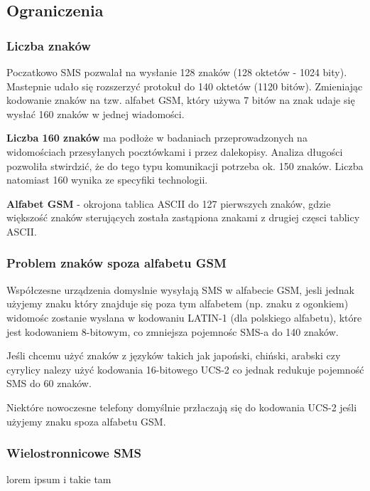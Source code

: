 \documentclass[xcolor=table]{beamer}
\begin{document}
\subsection{Ograniczenia}
\begin{frame}[allowframebreaks]
  \frametitle{Liczba znaków}

  Poczatkowo SMS pozwalał na wysłanie 128 znaków (128 oktetów - 1024 bity).
  Mastepnie udało się rozszerzyć protokuł do 140 oktetów (1120 bitów).
  Zmieniając kodowanie znaków na tzw. alfabet GSM, który używa 7 bitów na znak
  udaje się wysłać 160 znaków w jednej wiadomości.

  \textbf{Liczba 160 znaków} ma podłoże w badaniach przeprowadzonych na
  widomościach przesyłanych pocztówkami i przez dalekopisy. Analiza długości
  pozwoliła stwirdzić, że do tego typu komunikacji potrzeba ok. 150 znaków.
  Liczba natomiast 160 wynika ze specyfiki technologii.

  \framebreak

  \textbf{Alfabet GSM} - okrojona tablica ASCII do 127 pierwszych znaków, gdzie
  większość znaków sterujących została zastąpiona znakami z drugiej częsci
  tablicy ASCII.

\end{frame}
\begin{frame}
  \frametitle{Problem znaków spoza alfabetu GSM}

  Współczesne urządzenia domyslnie wysyłają SMS w alfabecie GSM, jesli jednak
  użyjemy znaku który znajduje się poza tym alfabetem (np. znaku z ogonkiem)
  widomośc zostanie wyslana w kodowaniu LATIN-1 (dla polskiego alfabetu), które
  jest kodowaniem 8-bitowym, co zmniejsza pojemnośc SMS-a do 140 znaków.

  Jeśli chcemu użyć znaków z języków takich jak japoński, chiński, arabski czy
  cyrylicy nalezy użyć kodowania 16-bitowego UCS-2 co jednak redukuje pojemność
  SMS do 60 znaków.

  Niektóre nowoczesne telefony domyślnie przłaczają się do kodowania UCS-2
  jeśli użyjemy znaku spoza alfabetu GSM.
\end{frame}

\begin{frame}
  \frametitle{Wielostronnicowe SMS}

lorem ipsum i takie tam

\end{frame}

\end{document}
